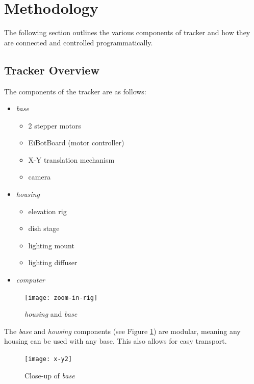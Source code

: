 \documentclass[main.tex]{subfiles}
\begin{document}
\graphicspath{{img/}{../img/}}




\section{Methodology}
The following section outlines the various components of tracker and how they are connected and controlled programmatically. 
\subsection{Tracker Overview}
The components of the tracker are as follows:
\begin{itemize}
\item \textit{base}
  \begin{itemize}
  \item 2 stepper motors
  \item EiBotBoard (motor controller)
  \item X-Y translation mechanism 
  \item camera
  \end{itemize}

\item \textit{housing}
  \begin{itemize}
  \item elevation rig
  \item dish stage
  \item lighting mount
  \item lighting diffuser
  \end{itemize}

\item \textit{computer}
\end{itemize}

\begin{figure}[!htbp]
  \centering
  \texttt{[image: zoom-in-rig]}
  \caption{\textit{housing} and \textit{base}}
  \label{fig:rig}
\end{figure}

The \textit{base} and \textit{housing} components (see Figure \ref{fig:rig}) are modular, meaning any housing can be used with any base. This also allows for easy transport. \\

\begin{figure}[!htbp]
\centering
\texttt{[image: x-y2]}
\caption{Close-up of \textit{base}}
\label{fig:x-y}
\end{figure}
\end{document}
